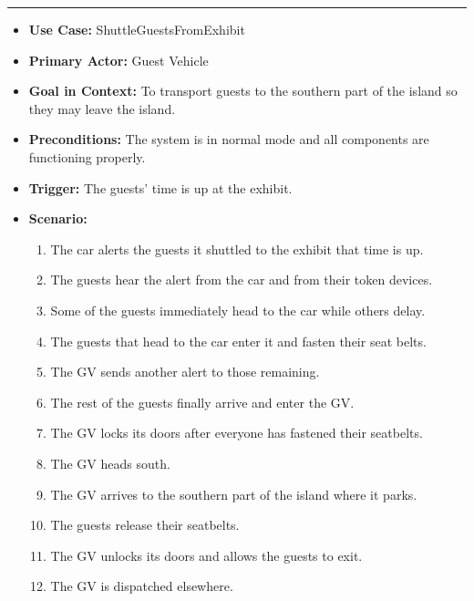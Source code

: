 \documentclass[12pt]{article}
\begin{document}
    \par\noindent\rule{\textwidth}{0.4pt}    
    \begin{itemize}
        \item[]\textbf{Use Case:}                                
            ShuttleGuestsFromExhibit

        \item[]\textbf{Primary Actor:}
            Guest Vehicle

        \item[]\textbf{Goal in Context:}
            To transport guests to the southern part of the island so they may 
            leave the island.

        \item[]\textbf{Preconditions:}
            The system is in normal mode and all components are functioning properly.

        \item[]\textbf{Trigger:}
            The guests' time is up at the exhibit.

        \item[]\textbf{Scenario:}
            \begin{enumerate}
                \item The car alerts the guests it shuttled to the exhibit that time is up.
                \item The guests hear the alert from the car and from their token devices.
                \item Some of the guests immediately head to the car while others delay.
                \item The guests that head to the car enter it and fasten their seat belts.
                \item The GV sends another alert to those remaining.
                \item The rest of the guests finally arrive and enter the GV.
                \item The GV locks its doors after everyone has fastened their seatbelts.
                \item The GV heads south.
                \item The GV arrives to the southern part of the island where it parks.
                \item The guests release their seatbelts.
                \item The GV unlocks its doors and allows the guests to exit.
                \item The GV is dispatched elsewhere.
            \end{enumerate}


\end{itemize}
\end{document}
